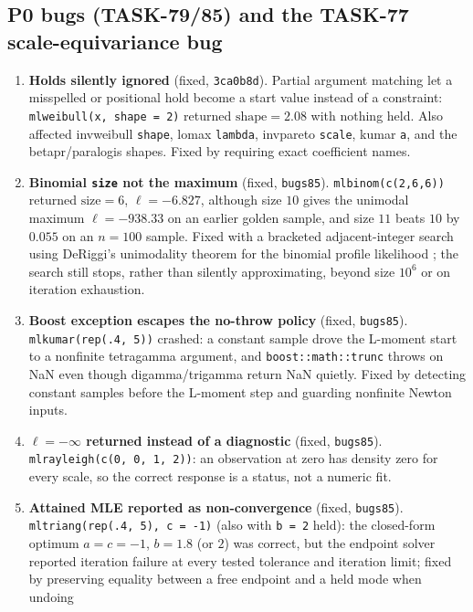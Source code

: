 \documentclass[11pt]{article}
\newcommand{\code}[1]{\texttt{#1}}
\theoremstyle{plain}
\theoremstyle{definition}
\theoremstyle{remark}
\begin{document}
\subsection*{P0 bugs (TASK-79/85) and the TASK-77 scale-equivariance bug}

\begin{enumerate}
  \item[B1] \textbf{Holds silently ignored} (fixed, \code{3ca0b8d}). Partial
    argument matching let a misspelled or positional hold become a start
    value instead of a constraint: \code{mlweibull(x, shape = 2)} returned
    $\mathrm{shape}=2.08$ with nothing held. Also affected invweibull
    \code{shape}, lomax \code{lambda}, invpareto \code{scale}, kumar
    \code{a}, and the betapr/paralogis shapes. Fixed by requiring exact
    coefficient names.
  \item[B2] \textbf{Binomial \code{size} not the maximum} (fixed,
    \code{bugs85}). \code{mlbinom(c(2,6,6))} returned $\mathrm{size}=6$,
    $\ell=-6.827$, although size $10$ gives the unimodal maximum
    $\ell=-938.33$ on an earlier golden sample, and size $11$ beats $10$ by
    $0.055$ on an $n=100$ sample. Fixed with a bracketed adjacent-integer
    search using DeRiggi's unimodality theorem for the binomial profile
    likelihood \cite{deriggi1983}; the search still stops, rather than
    silently approximating, beyond size $10^6$ or on iteration exhaustion.
  \item[B3] \textbf{Boost exception escapes the no-throw policy} (fixed,
    \code{bugs85}). \code{mlkumar(rep(.4, 5))} crashed: a constant sample
    drove the L-moment start to a nonfinite tetragamma argument, and
    \code{boost::math::trunc} throws on NaN even though digamma/trigamma
    return NaN quietly. Fixed by detecting constant samples before the
    L-moment step and guarding nonfinite Newton inputs.
  \item[B4] \textbf{$\ell=-\infty$ returned instead of a diagnostic} (fixed,
    \code{bugs85}). \code{mlrayleigh(c(0, 0, 1, 2))}: an observation at zero
    has density zero for every scale, so the correct response is a status,
    not a numeric fit.
  \item[B5] \textbf{Attained MLE reported as non-convergence} (fixed,
    \code{bugs85}). \code{mltriang(rep(.4, 5), c = -1)} (also with
    \code{b = 2} held): the closed-form optimum $a=c=-1$, $b=1.8$ (or $2$)
    was correct, but the endpoint solver reported iteration failure at
    every tested tolerance and iteration limit; fixed by preserving
    equality between a free endpoint and a held mode when undoing

\end{enumerate}
\end{document}
